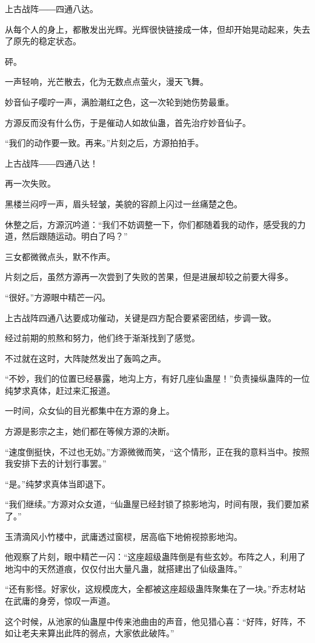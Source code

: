 \begin{this_body}
上古战阵――四通八达。

从每个人的身上，都散发出光辉。光辉很快链接成一体，但却开始晃动起来，失去了原先的稳定状态。

砰。

一声轻响，光芒散去，化为无数点点萤火，漫天飞舞。

妙音仙子嘤咛一声，满脸潮红之色，这一次轮到她伤势最重。

方源反而没有什么伤，于是催动人如故仙蛊，首先治疗妙音仙子。

“我们的动作要一致。再来。”片刻之后，方源拍拍手。

上古战阵――四通八达！

再一次失败。

黑楼兰闷哼一声，眉头轻皱，美貌的容颜上闪过一丝痛楚之色。

休整之后，方源沉吟道：“我们不妨调整一下，你们都随着我的动作，感受我的力道，然后跟随运动。明白了吗？”

三女都微微点头，默不作声。

片刻之后，虽然方源再一次尝到了失败的苦果，但是进展却较之前要大得多。

“很好。”方源眼中精芒一闪。

上古战阵四通八达要成功催动，关键是四方配合要紧密团结，步调一致。

经过前期的煎熬和努力，他们终于渐渐找到了感觉。

不过就在这时，大阵陡然发出了轰鸣之声。

“不妙，我们的位置已经暴露，地沟上方，有好几座仙蛊屋！”负责操纵蛊阵的一位纯梦求真体，赶过来汇报道。

一时间，众女仙的目光都集中在方源的身上。

方源是影宗之主，她们都在等候方源的决断。

“速度倒挺快，不过也无妨。”方源微微而笑，“这个情形，正在我的意料当中。按照我安排下去的计划行事罢。”

“是。”纯梦求真体当即退下。

“我们继续。”方源对众女道，“仙蛊屋已经封锁了掠影地沟，时间有限，我们要加紧了。”

玉清滴风小竹楼中，武庸透过窗棂，居高临下地俯视掠影地沟。

他观察了片刻，眼中精芒一闪：“这座超级蛊阵倒是有些玄妙。布阵之人，利用了地沟中的天然道痕，仅仅付出大量凡蛊，就搭建出了仙级蛊阵。”

“还有影怪。好家伙，这规模庞大，全都被这座超级蛊阵聚集在了一块。”乔志材站在武庸的身旁，惊叹一声道。

这个时候，从池家的仙蛊屋中传来池曲由的声音，他见猎心喜：“好阵，好阵，不如让老夫来算出此阵的弱点，大家依此破阵。”


\end{this_body}
